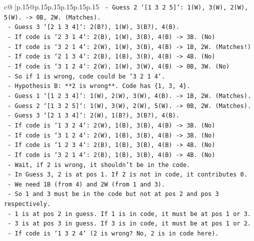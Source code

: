 \documentclass{article}
\begin{document}
{\begin{supertabular}{c@{$\;$}|p{.15\linewidth}@{}p{.15\linewidth}p{.15\linewidth}p{.15\linewidth}p{.15\linewidth}p{.15\linewidth}}
{{{\texttt{      {-} Guess 2 `{[}1 3 2 5{]}`: 1(W), 3(W), 2(W), 5(W). {-}> 0B, 2W. (Matches).} \\
\texttt{      {-} Guess 3 `{[}2 1 3 4{]}`: 2(B?), 1(W), 3(B?), 4(B).} \\
\texttt{        {-} If code is `2 3 1 4`: 2(B), 1(W), 3(B), 4(B) {-}> 3B. (No)} \\
\texttt{        {-} If code is `3 2 1 4`: 2(W), 1(W), 3(B), 4(B) {-}> 1B, 2W. (Matches!)} \\
\texttt{        {-} If code is `2 1 3 4`: 2(B), 1(B), 3(B), 4(B) {-}> 4B. (No)} \\
\texttt{        {-} If code is `3 1 2 4`: 2(W), 1(W), 3(W), 4(B) {-}> 0B, 3W. (No)} \\
\texttt{      {-} So if 1 is wrong, code could be `3 2 1 4`.} \\
\texttt{    {-} Hypothesis B: **2 is wrong**. Code has \{1, 3, 4\}.} \\
\texttt{      {-} Guess 1 `{[}1 2 3 4{]}`: 1(W), 2(W), 3(W), 4(B). {-}> 1B, 2W. (Matches).} \\
\texttt{      {-} Guess 2 `{[}1 3 2 5{]}`: 1(W), 3(W), 2(W), 5(W). {-}> 0B, 2W. (Matches).} \\
\texttt{      {-} Guess 3 `{[}2 1 3 4{]}`: 2(W), 1(B?), 3(B?), 4(B).} \\
\texttt{        {-} If code is `1 3 2 4`: 2(W), 1(B), 3(B), 4(B) {-}> 3B. (No)} \\
\texttt{        {-} If code is `3 1 2 4`: 2(W), 1(B), 3(B), 4(B) {-}> 3B. (No)} \\
\texttt{        {-} If code is `1 2 3 4`: 2(B), 1(B), 3(B), 4(B) {-}> 4B. (No)} \\
\texttt{        {-} If code is `3 2 1 4`: 2(B), 1(B), 3(B), 4(B) {-}> 4B. (No)} \\
\texttt{        {-} Wait, if 2 is wrong, it shouldn't be in the code.} \\
\texttt{        {-} In Guess 3, 2 is at pos 1. If 2 is not in code, it contributes 0.} \\
\texttt{        {-} We need 1B (from 4) and 2W (from 1 and 3).} \\
\texttt{        {-} So 1 and 3 must be in the code but not at pos 2 and pos 3 respectively.} \\
\texttt{        {-} 1 is at pos 2 in guess. If 1 is in code, it must be at pos 1 or 3.} \\
\texttt{        {-} 3 is at pos 3 in guess. If 3 is in code, it must be at pos 1 or 2.} \\
\texttt{        {-} If code is `1 3 2 4` (2 is wrong? No, 2 is in code here).} \\
}}}
\end{supertabular}}
\end{document}
